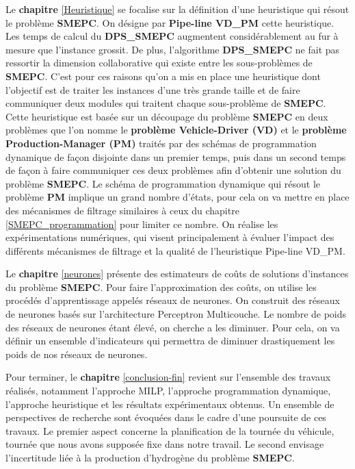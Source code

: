 Le \textbf{chapitre} \ref{Heuristique} se focalise sur la définition d'une heuristique qui résout le problème \textbf{SMEPC}. On désigne par \textbf{Pipe-line VD\_PM} cette heuristique. Les temps de calcul du \textbf{DPS\_SMEPC} augmentent considérablement au fur à mesure que l'instance grossit. De plus, l'algorithme \textbf{DPS\_SMEPC} ne fait pas ressortir la dimension collaborative qui existe entre les sous-problèmes de \textbf{SMEPC}. C'est pour ces raisons qu'on a mis en place une heuristique dont l'objectif est de traiter les instances d'une très grande taille et de faire communiquer deux modules qui traitent chaque sous-problème de \textbf{SMEPC}. Cette heuristique est basée sur un découpage du problème \textbf{SMEPC} en deux problèmes que l'on nomme le \textbf{problème Vehicle-Driver (VD)} et le \textbf{problème Production-Manager (PM)} traités par des schémas de programmation dynamique de façon disjointe dans un premier temps, puis dans un second temps de façon à faire communiquer ces deux problèmes afin d'obtenir une solution du problème \textbf{SMEPC}. Le schéma de programmation dynamique qui résout le problème \textbf{PM} implique un grand nombre d'états, pour cela on va mettre en place des mécanismes de filtrage similaires à ceux du chapitre \ref{SMEPC_programmation} pour limiter ce nombre. On réalise les expérimentations numériques, qui visent principalement à évaluer l'impact des différents mécanismes de filtrage et la qualité de l'heuristique Pipe-line VD\_PM.

Le \textbf{chapitre} \ref{neurones} présente des estimateurs de coûts de solutions d'instances du problème \textbf{SMEPC}. Pour faire l'approximation des coûts, on utilise les procédés d'apprentissage appelés réseaux de neurones. On construit des réseaux de neurones basés sur l'architecture Perceptron Multicouche. Le nombre de poids des réseaux de neurones étant élevé, on cherche a les diminuer. Pour cela, on va définir un ensemble d'indicateurs qui permettra de diminuer drastiquement les poids de nos réseaux de neurones.

Pour terminer, le \textbf{chapitre} \ref{conclusion-fin} revient sur l'ensemble des travaux réalisés, notamment l'approche MILP, l'approche programmation dynamique, l'approche heuristique et les résultats expérimentaux obtenus. Un ensemble de perspectives de recherche sont évoquées dans le cadre d'une poursuite de ces travaux. Le premier aspect concerne la planification de la tournée du véhicule, tournée que nous avons supposée fixe dans notre travail. Le second envisage l'incertitude liée à la production d'hydrogène du problème \textbf{SMEPC}. 